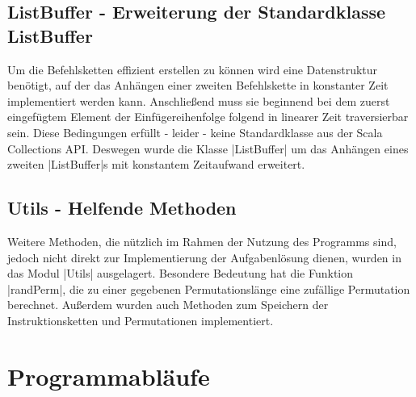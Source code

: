 \subsection{ListBuffer - Erweiterung der Standardklasse ListBuffer}
Um die Befehlsketten effizient erstellen zu können wird eine Datenstruktur benötigt,
auf der das Anhängen einer zweiten Befehlskette in konstanter Zeit implementiert werden kann.
Anschließend muss sie beginnend bei dem zuerst eingefügtem Element der Einfügereihenfolge folgend in linearer Zeit traversierbar sein.
Diese Bedingungen erfüllt - leider - keine Standardklasse aus der Scala Collections API.
Deswegen wurde die Klasse |ListBuffer| um das Anhängen eines zweiten |ListBuffer|s mit konstantem Zeitaufwand erweitert.

\subsection{Utils - Helfende Methoden}
Weitere Methoden, die nützlich im Rahmen der Nutzung des Programms sind, jedoch nicht direkt zur Implementierung der Aufgabenlösung dienen,
wurden in das Modul |Utils| ausgelagert. Besondere Bedeutung hat die Funktion |randPerm|, die zu einer gegebenen Permutationslänge
eine zufällige Permutation berechnet. %
Außerdem wurden auch Methoden zum Speichern der Instruktionsketten und Permutationen implementiert.

\clearpage
\section{Programmabläufe}
